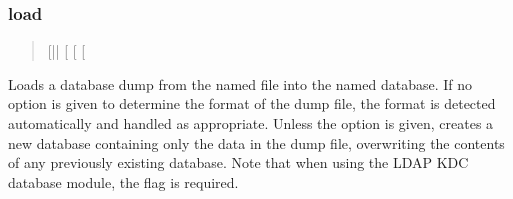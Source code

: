 \documentclass[letterpaper,10pt,english]{sphinxmanual}
\begin{document}
\subsubsection{load}
\label{\detokenize{admin/admin_commands/kdb5_util:load}}\label{\detokenize{admin/admin_commands/kdb5_util:kdb5-util-dump-end}}\label{\detokenize{admin/admin_commands/kdb5_util:kdb5-util-load}}\begin{quote}

\sphinxAtStartPar
{} {[}||\sphinxstylestrong{\sphinxhyphen{}r18}{]} {[}\sphinxstylestrong{\sphinxhyphen{}hash}{]}
{[}\sphinxstylestrong{\sphinxhyphen{}verbose}{]} {[}\sphinxstylestrong{\sphinxhyphen{}update}{]} 
\end{quote}

\sphinxAtStartPar
Loads a database dump from the named file into the named database.  If
no option is given to determine the format of the dump file, the
format is detected automatically and handled as appropriate.  Unless
the  option is given,  creates a new database
containing only the data in the dump file, overwriting the contents of
any previously existing database.  Note that when using the LDAP KDC
database module, the  flag is required.
\end{document}
